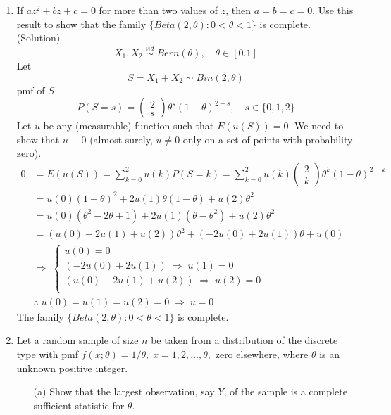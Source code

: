 \documentclass{oblivoir}
\newcommand{\mat}[2]{\begin{pmatrix} #1 \\ #2 \end{pmatrix}}
\newcommand{\blue}[1]{{\color{blue} #1}}
\begin{document}
\begin{enumerate}
\vspace{5mm}
\item 
If $az^2 + bz + c = 0$ for more than two values of $z$, then $a=b=c=0$. Use this result to show that the family $\{Beta(2, \theta) : 0 < \theta < 1\}$
is complete. \\
\blue{(Solution)} 
$$
X_1, X_2 \; \overset{iid}{\sim} \; Bern(\theta), \quad \theta \in [0.1]
$$
Let
$$
S = X_1 + X_2 \sim Bin(2,\theta) 
$$
pmf of $S$
$$
P(S=s) = \mat{2}{s} \theta^s (1-\theta)^{2-s}, \quad s \in\{0, 1, 2\}
$$
Let $u$ be any (measurable) function such that $E(u(S)) = 0$. We need to show that $u \equiv 0$ (almost surely,
$u \ne 0$ only on a set of points with probability zero).
\begin{align*}
0 &= E(u(S)) = \sum_{k=0}^2 u(k) P(S = k) = \sum_{k=0}^2 u(k) \mat{2}{k} \theta^k (1-\theta)^{2-k} \\
&= u(0) (1-\theta)^2 + 2u(1) \theta(1-\theta) + u(2) \theta^2 \\
&= u(0) (\theta^2 -2\theta + 1) + 2u(1) (\theta - \theta^2) + u(2) \theta^2 \\
&= (u(0) - 2u(1) +u(2)) \theta^2 + (-2u(0) + 2u(1)) \theta + u(0) \\
&\Rightarrow \; 
\begin{cases}
u(0) = 0 \\
(-2u(0) + 2u(1)) \; \Rightarrow \; u(1) = 0\\
(u(0) - 2u(1) +u(2)) \; \Rightarrow \; u(2) = 0\\
\end{cases} \\
&\therefore \; u(0) = u(1) = u(2) = 0 \; \Rightarrow \; u = 0
\end{align*}
The family $\{Beta(2, \theta) : 0 < \theta < 1\}$ is complete.
\vspace{5mm}
\item
Let a random sample of size $n$ be taken from a distribution of the discrete type with pmf $f(x;\theta) = 1/\theta,\; x = 1,2,\ldots,\theta,$ zero elsewhere,
where $\theta$ is an unknown positive integer.
\begin{enumerate}
\item[(a)]
Show that the largest observation, say $Y$, of the sample is a complete sufficient statistic for $\theta$. \\

\end{enumerate}
\end{enumerate}
\end{document}
